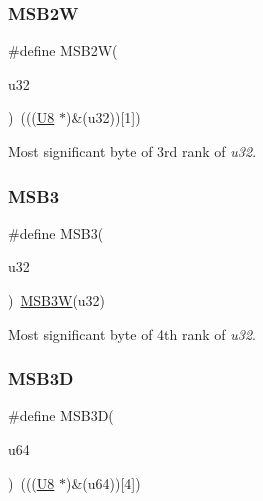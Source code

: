 \subsubsection{\texorpdfstring{MSB2W}{MSB2W}}
{\footnotesize\ttfamily \#define M\+S\+B2W(\begin{DoxyParamCaption}\item[{}]{u32 }\end{DoxyParamCaption})~(((\mbox{\hyperlink{group__group__sam0__utils_gaa63ef7b996d5487ce35a5a66601f3e73}{U8}}  $\ast$)\&(u32))\mbox{[}1\mbox{]})}



Most significant byte of 3rd rank of {\itshape u32}. 

\mbox{\label{group__group__sam0__utils_gaeeb8918fc580ce01d45f71863eebff90}} 
\subsubsection{\texorpdfstring{MSB3}{MSB3}}
{\footnotesize\ttfamily \#define M\+S\+B3(\begin{DoxyParamCaption}\item[{}]{u32 }\end{DoxyParamCaption})~\mbox{\hyperlink{group__group__sam0__utils_gad6ab5ac6e3e95525d56d757c9718e352}{M\+S\+B3W}}(u32)}



Most significant byte of 4th rank of {\itshape u32}. 

\mbox{\label{group__group__sam0__utils_gaf7972d3282ec9ecb97afa34e848ede2c}} 
\subsubsection{\texorpdfstring{MSB3D}{MSB3D}}
{\footnotesize\ttfamily \#define M\+S\+B3D(\begin{DoxyParamCaption}\item[{}]{u64 }\end{DoxyParamCaption})~(((\mbox{\hyperlink{group__group__sam0__utils_gaa63ef7b996d5487ce35a5a66601f3e73}{U8}}  $\ast$)\&(u64))\mbox{[}4\mbox{]})}



